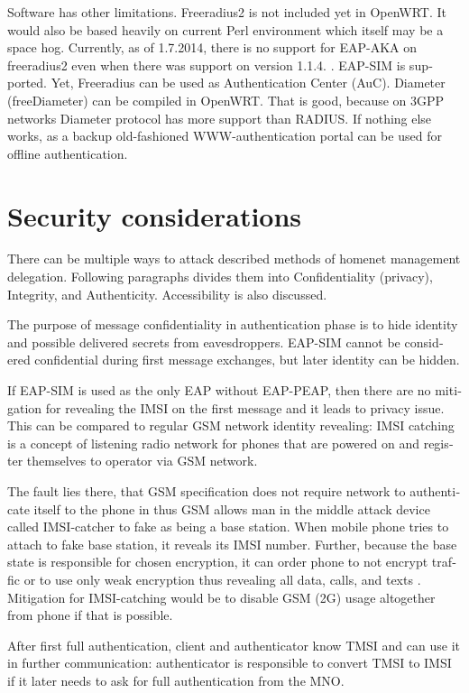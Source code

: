 \documentclass[12pt,a4paper,english]{tutthesis}
\begin{document}
\begin{otherlanguage}{english}
Software has other limitations. Freeradius2 is not included yet in OpenWRT.
It would also be based heavily on current Perl environment which
itself may be a space hog. 
Currently, as of 1.7.2014, there is no support for EAP-AKA on
freeradius2 even when there was support on version 1.1.4. \cite{freeradius2}.
EAP-SIM is supported.
Yet, Freeradius can be used as Authentication Center (AuC).
Diameter (freeDiameter) can be compiled in OpenWRT. That is good,
because on 3GPP networks Diameter protocol has more support than RADIUS.
If nothing else works, as a backup old-fashioned WWW-authentication
portal can be used for offline authentication.


\section{Security considerations}
\label{sec-6-5}



There can be multiple ways to attack described methods of
homenet management delegation. Following paragraphs divides them into
Confidentiality (privacy), Integrity, and
Authenticity. Accessibility is also discussed.


The purpose of message confidentiality in authentication phase is
to hide identity and possible delivered secrets from
eavesdroppers. EAP-SIM cannot be considered confidential during 
first message exchanges, but later identity can be hidden.

If EAP-SIM is used as the only EAP without EAP-PEAP, then 
there are no mitigation for revealing the IMSI on the first message
and it leads to privacy issue.
This can be compared to regular GSM network identity revealing: IMSI
catching is a concept of listening radio network for phones that are
powered on and register themselves to operator via GSM network.  

The
fault lies there, that GSM specification does not require network to
authenticate itself to the phone in thus GSM allows man in the middle
attack device called IMSI-catcher to fake as being a base station.
When mobile phone tries to attach to fake base station, it reveals its
IMSI number. Further, because the base state is responsible for chosen
encryption, it can order phone to not encrypt traffic or to use only
weak encryption thus revealing all data, calls, and
texts \cite{imsi-heise}. Mitigation for IMSI-catching would be to
disable GSM (2G) usage altogether from phone if that is possible.

After first full authentication, client and authenticator 
know TMSI and can use it in further communication: authenticator 
is responsible to convert TMSI to IMSI if it later needs to 
ask for full authentication from the MNO.








\end{otherlanguage}
\end{document}
